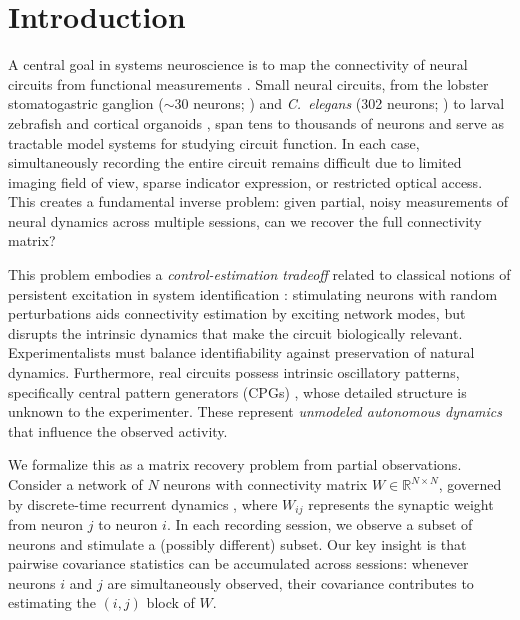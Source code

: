 \documentclass{article}
\begin{document}
\section{Introduction}
\label{sec:intro}

A central goal in systems neuroscience is to map the connectivity of neural circuits from functional measurements \citep{power2011functional}.
Small neural circuits, from the lobster stomatogastric ganglion (${\sim}30$ neurons; \citep{marder2007understanding}) and \textit{C.~elegans} (302 neurons; \citep{white1986structure, cook2019whole}) to larval zebrafish \citep{ahrens2013whole} and cortical organoids \citep{quadrato2017cell}, span tens to thousands of neurons and serve as tractable model systems for studying circuit function. In each case, simultaneously recording the entire circuit remains difficult due to limited imaging field of view, sparse indicator expression, or restricted optical access.
This creates a fundamental inverse problem: given partial, noisy measurements of neural dynamics across multiple sessions, can we recover the full connectivity matrix?

This problem embodies a \emph{control-estimation tradeoff} related to classical notions of persistent excitation in system identification \citep{ljung1998system}: stimulating neurons with random perturbations aids connectivity estimation by exciting network modes, but disrupts the intrinsic dynamics that make the circuit biologically relevant.
Experimentalists must balance identifiability against preservation of natural dynamics.
Furthermore, real circuits possess intrinsic oscillatory patterns, specifically central pattern generators (CPGs) \citep{marder2001central}, whose detailed structure is unknown to the experimenter.
These represent \emph{unmodeled autonomous dynamics} that influence the observed activity.

We formalize this as a matrix recovery problem from partial observations.
Consider a network of $N$ neurons with connectivity matrix $W \in \mathbb{R}^{N \times N}$, governed by discrete-time recurrent dynamics \citep{sussillo2009generating}, where $W_{ij}$ represents the synaptic weight from neuron $j$ to neuron $i$.
In each recording session, we observe a subset of neurons and stimulate a (possibly different) subset.
Our key insight is that pairwise covariance statistics can be accumulated across sessions: whenever neurons $i$ and $j$ are simultaneously observed, their covariance contributes to estimating the $(i,j)$ block of $W$.
\end{document}
